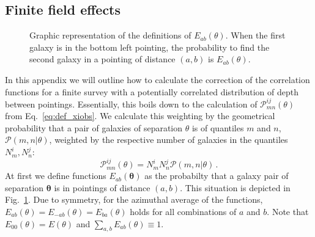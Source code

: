 \documentclass{aa}
\def\b#1{\bm{#1}}
\begin{document}
\begin{appendix}
\section{Finite field effects}
\label{sec:expand_eoftheta}
\begin{figure}
    \sidecaption
    \centering
    \def\svgwidth{200pt}    
      
    \caption{Graphic representation of the definitions of $E_{ab}(\theta)$. When the first galaxy is in the bottom left pointing, the probability to find the second galaxy in a pointing of distance $(a,b)$ is $E_{ab}(\theta)$.}
    \label{fig:expand_etheta}
\end{figure}
In this appendix we will outline how to calculate the correction of the correlation functions for a finite survey with a potentially correlated distribution of depth between pointings. Essentially, this boils down to the calculation of $\mathcal{P}_{mn}^{ij}(\theta)$ from Eq.~\eqref{eq:def_xiobs}. We calculate this weighting by the geometrical probability that a pair of galaxies of separation $\theta$ is of quantiles $m$ and $n$, $\mathcal{P}(m,n|\theta)$, weighted by the respective number of galaxies in the quantiles $N_m^i,N_n^j$: \begin{equation}
\mathcal{P}_{mn}^{ij}(\theta) = N_m^iN_n^j\mathcal{P}(m,n|\theta)\, .
\label{eq:pmnij1}
\end{equation}
 At first we define functions $E_{ab}(\b\theta)$ as the probabilty that a galaxy pair of separation $\b\theta$ is in pointings of distance $(a,b)$. This situation is depicted in Fig.~\ref{fig:expand_etheta}. Due to symmetry, for the azimuthal average of the functions, $E_{ab}(\theta) = E_{-ab}(\theta) = E_{ba}(\theta)$ holds for all combinations of $a$ and $b$. Note that $E_{00}(\theta)=E(\theta)$ and $\sum_{a,b}E_{ab}(\theta)\equiv 1$.


\end{appendix}
\end{document}
